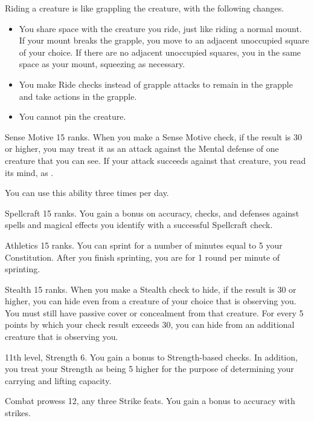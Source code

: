 Riding a creature is like grappling the creature, with the following changes.
\begin{itemize}
    \item You share space with the creature you ride, just like riding a normal mount.
        If your mount breaks the grapple, you move to an adjacent unoccupied square of your choice.
        If there are no adjacent unoccupied squares, you in the same space as your mount, squeezing as necessary.
    \item You make Ride checks instead of grapple attacks to remain in the grapple and take actions in the grapple.
    \item You cannot pin the creature.
\end{itemize}

\featpre Sense Motive 15 ranks.
\featben When you make a Sense Motive check, if the result is 30 or higher, you may treat it as an attack against the Mental defense of one creature that you can see.
If your attack succeeds against that creature, you read its mind, as .

You can use this ability three times per day.

\featpre Spellcraft 15 ranks.
\featben You gain a  bonus on accuracy, checks, and defenses against spells and magical effects you identify with a successful Spellcraft check.

\featpre Athletics 15 ranks.
\featben You can sprint for a number of minutes equal to 5 \add your Constitution.
After you finish sprinting, you are \fatigued for 1 round per minute of sprinting.

\featpre Stealth 15 ranks.
\featben When you make a Stealth check to hide, if the result is 30 or higher, you can hide even from a creature of your choice that is observing you.
You must still have passive cover or concealment from that creature.
For every 5 points by which your check result exceeds 30, you can hide from an additional creature that is observing you.

\featpres 11th level, Strength 6.
\featben You gain a  bonus to Strength-based checks.
In addition, you treat your Strength as being 5 higher for the purpose of determining your carrying and lifting capacity.

\featpres Combat prowess 12, any three Strike feats.
\featben You gain a  bonus to accuracy with strikes.

